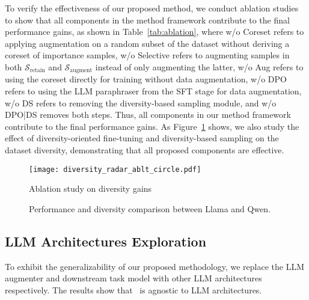 To verify the effectiveness of our proposed method, we conduct ablation studies to show that all components in the method framework contribute to the final performance gains, as shown in Table~\ref{tab:ablation}, where w/o Coreset refers to applying augmentation on a random subset of the dataset without deriving a coreset of importance samples, w/o Selective refers to augmenting samples in both \(\mathcal{S}_\text{retain}\) and \(\mathcal{S}_\text{augment}\) instead of only augmenting the latter, w/o Aug refers to using the coreset directly for training without data augmentation, w/o DPO refers to using the LLM paraphraser from the SFT stage for data augmentation, w/o DS refers to removing the diversity-based sampling module, and w/o DPO|DS removes both steps. 
Thus, all components in our method framework contribute to the final performance gains. 
As Figure~\ref{fig:div_ablt} shows, we also study the effect of diversity-oriented fine-tuning and diversity-based sampling on the dataset diversity, demonstrating that all proposed components are effective. 


\begin{figure}[t]
    \centering
    \texttt{[image: diversity\_radar\_ablt\_circle.pdf]}
    \vspace{-3mm}
    \caption{Ablation study on diversity gains}
    \vspace{-3mm}
    \label{fig:div_ablt}
\end{figure}






\begin{figure}[t]
    \centering
    \vspace{-3mm}
    \vspace{-2mm}
    \caption{Performance and diversity comparison between Llama and Qwen.}
    \vspace{-3mm}
    \label{fig:qwen}
\end{figure}

\subsection{LLM Architectures Exploration}
To exhibit the generalizability of our proposed methodology, we replace the LLM augmenter and downstream task model with other LLM architectures respectively. The results show that \Methodnamec~is agnostic to LLM architectures.

